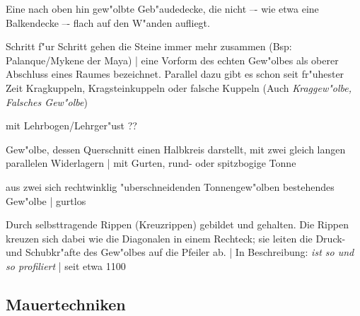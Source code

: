 \documentclass[emulatestandardclasses]{scrartcl}
\begin{document}
\begin{description}[leftmargin=!,labelwidth=\widthof{\bfseries Kreuzrippengew"olbe}]
  \item[Gew"olbe] Eine nach oben hin gew"olbte Geb"audedecke, die nicht –- wie etwa eine Balkendecke –- flach auf den W"anden aufliegt.
  \item[Unechtes Gew"olbe] Schritt f"ur Schritt gehen die Steine immer mehr zusammen (Bsp: Palanque/Mykene der Maya) | eine Vorform des echten Gew"olbes als oberer Abschluss eines Raumes bezeichnet. Parallel dazu gibt es schon seit fr"uhester Zeit Kragkuppeln, Kragsteinkuppeln oder falsche Kuppeln (Auch \emph{Kraggew"olbe, Falsches Gew"olbe})
  \item[W"olbung] mit Lehrbogen/Lehrger"ust ??
  \item[Tonnengew"olbe] Gew"olbe, dessen Querschnitt einen Halbkreis darstellt, mit zwei gleich langen parallelen Widerlagern | mit Gurten, rund- oder spitzbogige Tonne
  \item[Kreuzgratgew"olbe] aus zwei sich rechtwinklig "uberschneidenden Tonnengew"olben bestehendes Gew"olbe | gurtlos
  \item[Kreuzrippengew"olbe] Durch selbsttragende Rippen (Kreuzrippen) gebildet und gehalten. Die Rippen kreuzen sich dabei wie die Diagonalen in einem Rechteck; sie leiten die Druck- und Schubkr"afte des Gew"olbes auf die Pfeiler ab. | In Beschreibung: \emph{ist so und so profiliert} | seit etwa 1100 
\end{description}

\subsection{Mauertechniken}
\end{document}
